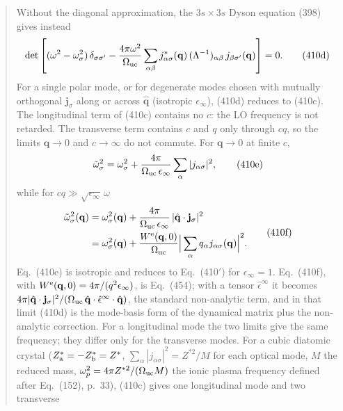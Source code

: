 \begin{quote}
\begin{equation*}
\tag{410c}
\end{equation*}
Without the diagonal approximation, the $3s\times3s$ Dyson equation (398) gives instead
\begin{equation*}
\det\left[(\omega^2-\omega^2_\sigma)\,\delta_{\sigma\sigma'}
-\frac{4\pi\omega^2}{\Omega_{\rm uc}}\sum_{\alpha\beta}j^*_{\alpha\sigma}(\mathbf q)\,(\Lambda^{-1})_{\alpha\beta}\,j_{\beta\sigma'}(\mathbf q)\right]=0 .
\tag{410d}
\end{equation*}
For a single polar mode, or for degenerate modes chosen with mutually orthogonal
$\mathbf j_\sigma$ along or across $\hat{\mathbf q}$ (isotropic $\epsilon_\infty$), (410d) reduces
to (410c). The longitudinal term of (410c) contains no $c$: the LO frequency is not retarded. The
transverse term contains $c$ and $q$ only through $cq$, so the limits $\mathbf q\to0$ and
$c\to\infty$ do not commute. For $\mathbf q\to0$ at finite $c$,
\begin{equation*}
\tilde\omega^2_\sigma=\omega^2_\sigma+\frac{4\pi}{\Omega_{\rm uc}\,\epsilon_\infty}\sum_\alpha|j_{\alpha\sigma}|^2 ,
\tag{410e}
\end{equation*}
while for $cq\gg\sqrt{\epsilon_\infty}\,\omega$
\begin{equation*}
\begin{aligned}
\tilde\omega^2_\sigma(\mathbf q)&=\omega^2_\sigma(\mathbf q)+\frac{4\pi}{\Omega_{\rm uc}\,\epsilon_\infty}\,|\hat{\mathbf q}\cdot\mathbf j_\sigma|^2\\
&=\omega^2_\sigma(\mathbf q)+\frac{W^{\rm e}(\mathbf q,0)}{\Omega_{\rm uc}}\Big|\sum_\alpha q_\alpha j_{\alpha\sigma}(\mathbf q)\Big|^2 .
\end{aligned}
\tag{410f}
\end{equation*}
Eq.~(410e) is isotropic and reduces to Eq.~(410$'$) for $\epsilon_\infty=1$. Eq.~(410f), with
$W^{\rm e}(\mathbf q,0)=4\pi/(q^2\epsilon_\infty)$, is Eq.~(454); with a tensor $\hat\epsilon^\infty$
it becomes $4\pi|\hat{\mathbf q}\cdot\mathbf j_\sigma|^2/(\Omega_{\rm uc}\,\hat{\mathbf q}\cdot\hat\epsilon^\infty\cdot\hat{\mathbf q})$,
the standard non-analytic term, and in that limit (410d) is the mode-basis form of the dynamical
matrix plus the non-analytic correction. For a longitudinal mode the two limits give the same
frequency; they differ only for the transverse modes. For a cubic diatomic crystal
($Z^*_{\rm a}=-Z^*_{\rm b}=Z^*$, $\sum_\alpha|j_{\alpha\sigma}|^2=Z^{*2}/M$ for each optical
mode, $M$ the reduced mass, $\omega_p^2=4\pi Z^{*2}/(\Omega_{\rm uc}M)$ the ionic plasma
frequency defined after Eq.~(152), p.~33), (410c) gives one longitudinal mode and two transverse

\end{quote}
